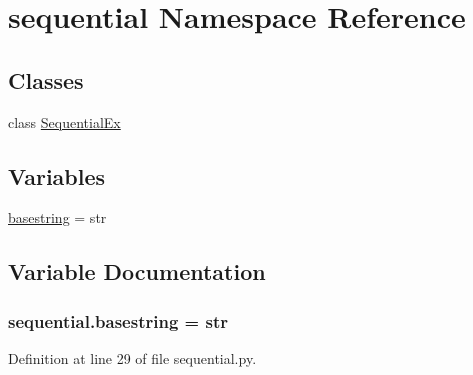 \hypertarget{namespacesequential}{\section{sequential Namespace Reference}
\label{namespacesequential}
}
\subsection*{Classes}
\begin{DoxyCompactItemize}
\item 
class \hyperlink{classsequential_1_1SequentialEx}{Sequential\-Ex}
\end{DoxyCompactItemize}
\subsection*{Variables}
\begin{DoxyCompactItemize}
\item 
\hyperlink{namespacesequential_a2bcf64415a328c57bebc08f7fed9d30c}{basestring} = str
\end{DoxyCompactItemize}


\subsection{Variable Documentation}
\hypertarget{namespacesequential_a2bcf64415a328c57bebc08f7fed9d30c}{
\subsubsection[{basestring}]{\setlength{\rightskip}{0pt plus 5cm}sequential.\-basestring = str}}\label{namespacesequential_a2bcf64415a328c57bebc08f7fed9d30c}


Definition at line 29 of file sequential.\-py.

